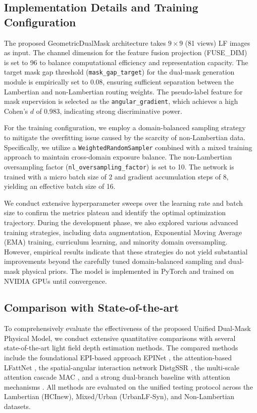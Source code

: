\documentclass[lettersize,journal]{IEEEtran}
\begin{document}
\subsection{Implementation Details and Training Configuration}
The proposed GeometricDualMask architecture takes $9 \times 9$ (81 views) LF images as input. The channel dimension for the feature fusion projection (FUSE\_DIM) is set to 96 to balance computational efficiency and representation capacity. The target mask gap threshold (\texttt{mask\_gap\_target}) for the dual-mask generation module is empirically set to 0.08, ensuring sufficient separation between the Lambertian and non-Lambertian routing weights. The pseudo-label feature for mask supervision is selected as the \texttt{angular\_gradient}, which achieves a high Cohen's $d$ of 0.983, indicating strong discriminative power.

For the training configuration, we employ a domain-balanced sampling strategy to mitigate the overfitting issue caused by the scarcity of non-Lambertian data. Specifically, we utilize a \texttt{WeightedRandomSampler} combined with a mixed training approach to maintain cross-domain exposure balance. The non-Lambertian oversampling factor (\texttt{nl\_oversampling\_factor}) is set to 10. The network is trained with a micro batch size of 2 and gradient accumulation steps of 8, yielding an effective batch size of 16. 

We conduct extensive hyperparameter sweeps over the learning rate and batch size to confirm the metrics plateau and identify the optimal optimization trajectory. During the development phase, we also explored various advanced training strategies, including data augmentation, Exponential Moving Average (EMA) training, curriculum learning, and minority domain oversampling. However, empirical results indicate that these strategies do not yield substantial improvements beyond the carefully tuned domain-balanced sampling and dual-mask physical priors. The model is implemented in PyTorch and trained on NVIDIA GPUs until convergence.

\subsection{Comparison with State-of-the-art}

To comprehensively evaluate the effectiveness of the proposed Unified Dual-Mask Physical Model, we conduct extensive quantitative comparisons with several state-of-the-art light field depth estimation methods. The compared methods include the foundational EPI-based approach EPINet \cite{shin2018epinet}, the attention-based LFattNet \cite{wang2019lfattnet}, the spatial-angular interaction network DistgSSR \cite{wang2020distgssr}, the multi-scale attention cascade MAC \cite{jin2021mac}, and a strong dual-branch baseline with attention mechanisms \cite{li2022dualbranch}. All methods are evaluated on the unified testing protocol across the Lambertian (HCInew), Mixed/Urban (UrbanLF-Syn), and Non-Lambertian datasets. 
\end{document}
